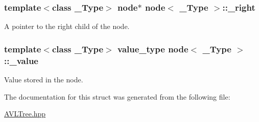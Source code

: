 \subsubsection[{\+\_\+right}]{\setlength{\rightskip}{0pt plus 5cm}template$<$class \+\_\+\+Type$>$ {\bf node}$\ast$ {\bf node}$<$ \+\_\+\+Type $>$\+::\+\_\+right}\label{structnode_aa65c4746c7391fb99f06fec3400addce}


A pointer to the right child of the node. 

\hypertarget{structnode_a8353cf23af61f2a637764a1a46ca8eb6}{}
\subsubsection[{\+\_\+value}]{\setlength{\rightskip}{0pt plus 5cm}template$<$class \+\_\+\+Type$>$ value\+\_\+type {\bf node}$<$ \+\_\+\+Type $>$\+::\+\_\+value}\label{structnode_a8353cf23af61f2a637764a1a46ca8eb6}


Value stored in the node. 



The documentation for this struct was generated from the following file\+:\begin{DoxyCompactItemize}
\item 
\hyperlink{_a_v_l_tree_8hpp}{A\+V\+L\+Tree.\+hpp}\end{DoxyCompactItemize}
